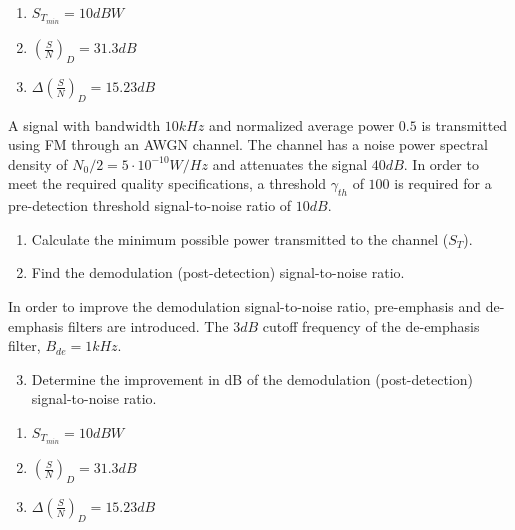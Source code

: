 \documentclass[idioma,boletin]{uah}
\begin{document}
{
\begin{enumerate}
	\item $S_{T_{min}} = 10dBW$
	\item $\left ( \frac{S}{N} \right )_D = 31.3 dB$
	\item $\Delta \left ( \frac{S}{N} \right )_D = 15.23 dB$
\end{enumerate}
}
{

	A signal with bandwidth $10 kHz$ and normalized average power $0.5$ is transmitted using FM through an AWGN channel. The channel has a noise power spectral density of $N_0/2=5\cdot 10^{-10} W/Hz$ and attenuates the signal $40 dB$. In order to meet the required quality specifications, a threshold $\gamma_{th}$ of $100$ is required for a pre-detection threshold signal-to-noise ratio of $10 dB$. 

	\begin{enumerate}
		\item Calculate the minimum possible power transmitted to the channel ($S_T$).
		\item Find the demodulation (post-detection) signal-to-noise ratio.
	\end{enumerate}
	 
In order to improve the demodulation signal-to-noise ratio, pre-emphasis and de-emphasis filters are introduced. The $3 dB$ cutoff frequency of the de-emphasis filter, $B_{de}= 1 kHz$.

\begin{enumerate}\setcounter{enumi}{2}
	\item Determine the improvement in dB of the demodulation (post-detection) signal-to-noise ratio.
\end{enumerate}

}
{
\begin{enumerate}
	\item $S_{T_{min}} = 10dBW$
	\item $\left ( \frac{S}{N} \right )_D = 31.3 dB$
	\item $\Delta \left ( \frac{S}{N} \right )_D = 15.23 dB$
\end{enumerate}
}
\end{document}

